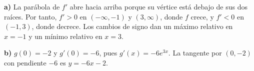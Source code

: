 \textbf{a)} La parábola de $f'$ abre hacia arriba porque su vértice está debajo de sus dos raíces. Por tanto, $f'>0$ en $(-\infty,-1)$ y $(3,\infty)$, donde $f$ crece, y $f'<0$ en $(-1,3)$, donde decrece. Los cambios de signo dan un máximo relativo en $x=-1$ y un mínimo relativo en $x=3$.

\textbf{b)} $g(0)=-2$ y $g'(0)=-6$, pues $g'(x)=-6e^{3x}$. La tangente por $(0,-2)$ con pendiente $-6$ es $\boxed{y=-6x-2}$.
